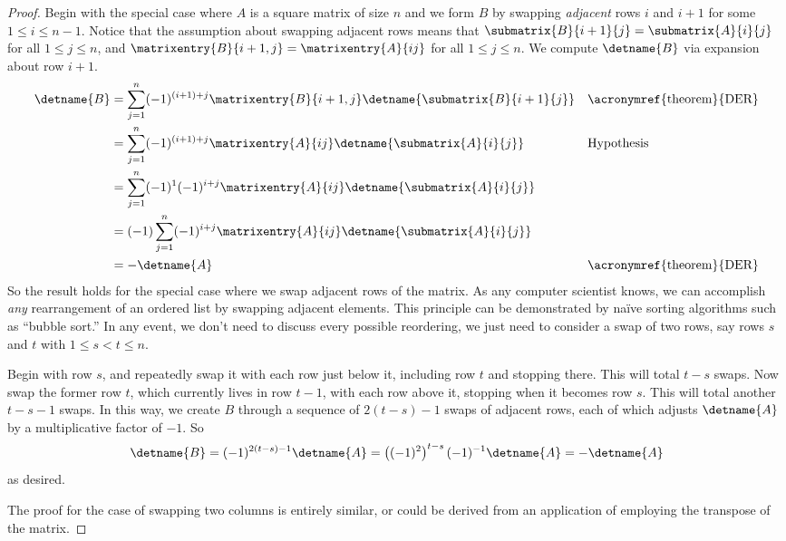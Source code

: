 %
\begin{proof}
Begin with the special case where $A$ is a square matrix of size $n$ and we form $B$ by swapping {\em adjacent} rows $i$ and $i+1$ for some $1\leq i\leq n-1$.    Notice that the assumption about swapping adjacent rows means that $\submatrix{B}{i+1}{j}=\submatrix{A}{i}{j}$ for all $1\leq j\leq n$, and $\matrixentry{B}{i+1,j}=\matrixentry{A}{ij}$ for all $1\leq j\leq n$.  We compute $\detname{B}$ via expansion about row $i+1$.
%
\begin{align*}
\detname{B}
&=
\sum_{j=1}^{n}(-1)^{(i+1)+j}\matrixentry{B}{i+1,j}\detname{\submatrix{B}{i+1}{j}}
&&\text{\acronymref{theorem}{DER}}\\
%
&=
\sum_{j=1}^{n}(-1)^{(i+1)+j}\matrixentry{A}{ij}\detname{\submatrix{A}{i}{j}}
&&\text{Hypothesis}\\
%
&=
\sum_{j=1}^{n}(-1)^{1}(-1)^{i+j}\matrixentry{A}{ij}\detname{\submatrix{A}{i}{j}}\\
%
&=
(-1)\sum_{j=1}^{n}(-1)^{i+j}\matrixentry{A}{ij}\detname{\submatrix{A}{i}{j}}\\
%
&=
-\detname{A}&&\text{\acronymref{theorem}{DER}}
%
\end{align*}
%
So the result holds for the special case where we swap adjacent rows of the matrix.  As any computer scientist knows, we can accomplish {\em any} rearrangement of an ordered list by swapping adjacent elements.  This principle can be demonstrated by na\"ive sorting algorithms such as ``bubble sort.''  In any event, we don't need to discuss every possible reordering, we just need to consider a swap of two rows, say rows $s$ and $t$ with $1\leq s<t\leq n$.\par
%
Begin with row $s$, and repeatedly swap it with each row just below it, including row $t$ and stopping there.  This will total $t-s$ swaps.  Now swap the former row $t$, which currently lives in row $t-1$, with each row above it, stopping when it becomes row $s$.  This will total another $t-s-1$ swaps.  In this way, we create $B$ through a sequence of $2(t-s)-1$ swaps of adjacent rows, each of which adjusts $\detname{A}$ by a multiplicative factor of $-1$.  So
%
\begin{equation*}
\detname{B}
=
(-1)^{2(t-s)-1}\detname{A}
=
\left((-1)^2\right)^{t-s}(-1)^{-1}\detname{A}
=
-\detname{A}
\end{equation*}
%
as desired.\par
%
The proof for the case of swapping two columns is entirely similar, or could be derived from an application of  employing the transpose of the matrix.
%
\end{proof}

